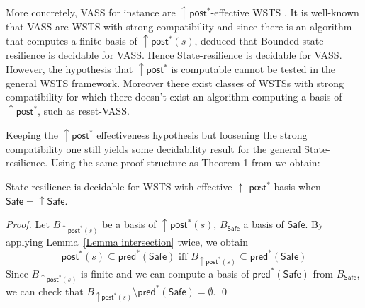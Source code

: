 \documentclass[runningheads]{llncs}
\newcommand{\alain}[1]{\todo[inline,color=red!20]{{\bf AF:} #1}}
\newcommand{\pred}{\textsf{pred}}
\newcommand{\post}{\textsf{post}}
\newcommand{\Bad}{\textsf{Bad}}
\newcommand{\Safe}{\textsf{Safe}}
\begin{document}
More concretely,
VASS for instance are $\uparrow \post^*$-effective WSTS \cite{DBLP:journals/corr/abs-2108-00889}. 
It is well-known that 
VASS are WSTS with strong compatibility and since there is an algorithm that computes a finite basis of  $\uparrow \post^*(s)$, \cite{DBLP:conf/gg/Ozkan22} deduced that {\sc Bounded-state-resilience} is decidable for VASS.
Hence {\sc State-resilience} is decidable for  
VASS.
However, the hypothesis that $\uparrow \post^*$ is computable cannot be tested in the general WSTS framework.  
Moreover there exist classes of WSTSs with strong 
 compatibility for which there doesn't exist an algorithm computing a basis of $\uparrow \post^*$, such as reset-VASS.

Keeping the $\uparrow \post^*$ effectiveness hypothesis but loosening the strong compatibility one still yields some decidability result for the general {\sc State-resilience}. Using the same proof structure as Theorem 1 from \cite{DBLP:journals/corr/abs-2108-00889} we obtain:


\begin{theorem}\label{post srp}
{\sc State-resilience} is decidable for 
 WSTS with effective 
$\uparrow$ $\post^*$ basis
when
$\Safe=\uparrow \Safe$. 
\end{theorem}


\begin{proof}
Let $B_{\uparrow \post^*(s)}$ 
 be a basis of $\uparrow \post^*(s)$, $B_\Safe$ a basis of $\Safe$.
By applying Lemma~\ref{Lemma intersection} twice, we obtain
\[ \post^*(s) %
 \subseteq \pred^*(\Safe) \text{ iff } B_{\uparrow \post^*(s)} %
 \subseteq \pred^*(\Safe)\]
Since $B_{\uparrow \post^*(s)}$ is finite and we can compute a basis of $\pred^*(\Safe)$ from $B_\Safe$, we can check that $B_{\uparrow \post^*(s)} %
 \setminus \pred^*(\Safe) = \emptyset$.  \qed
\end{proof}
\end{document}
